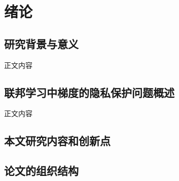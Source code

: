 \chapter{绪论}

\section{研究背景与意义}
正文内容


\section{联邦学习中梯度的隐私保护问题概述}
正文内容


\section{本文研究内容和创新点}


\section{论文的组织结构}
